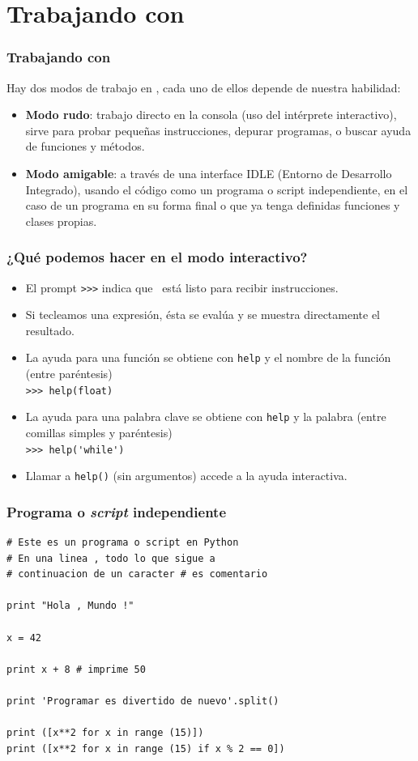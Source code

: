 \section{Trabajando con \python}
\begin{frame}
\frametitle{Trabajando con \python}
Hay dos modos de trabajo en \python, cada uno de ellos depende de nuestra habilidad:
\begin{itemize}[<+->]
\item \textbf{Modo rudo}: trabajo directo en la consola (uso del intérprete interactivo), sirve para probar pequeñas instrucciones, depurar programas, o buscar ayuda de funciones y métodos.
\item \textbf{Modo amigable}: a través de una interface IDLE (Entorno de Desarrollo Integrado), usando el código como un programa o script independiente, en el caso de un programa en su forma final o que ya tenga definidas funciones y clases propias.
\end{itemize}
\end{frame}
\begin{frame}[fragile]
\frametitle{¿Qué podemos hacer en el modo interactivo?}
\begin{itemize}
\item El prompt \verb|>>>| indica que \python\ está listo para recibir instrucciones.
\item Si tecleamos una expresión, ésta se evalúa y se muestra directamente el resultado.
\item La ayuda para una función se obtiene con \texttt{help} y el nombre de la función (entre paréntesis)
\\
\verb|>>> help(float)|
\item La ayuda para una palabra clave se obtiene con \texttt{help} y la palabra (entre comillas simples y paréntesis) 
\\
\verb|>>> help('while')|
\item Llamar a \texttt{help()} (sin argumentos) accede a la ayuda interactiva.
\end{itemize}
\end{frame}
\begin{frame}[fragile]
\frametitle{Programa o \textit{script} independiente}
\begin{lstlisting}
# Este es un programa o script en Python
# En una linea , todo lo que sigue a
# continuacion de un caracter # es comentario

print "Hola , Mundo !"

x = 42

print x + 8 # imprime 50

print 'Programar es divertido de nuevo'.split()

print ([x**2 for x in range (15)])
print ([x**2 for x in range (15) if x % 2 == 0])
\end{lstlisting}
\end{frame}
